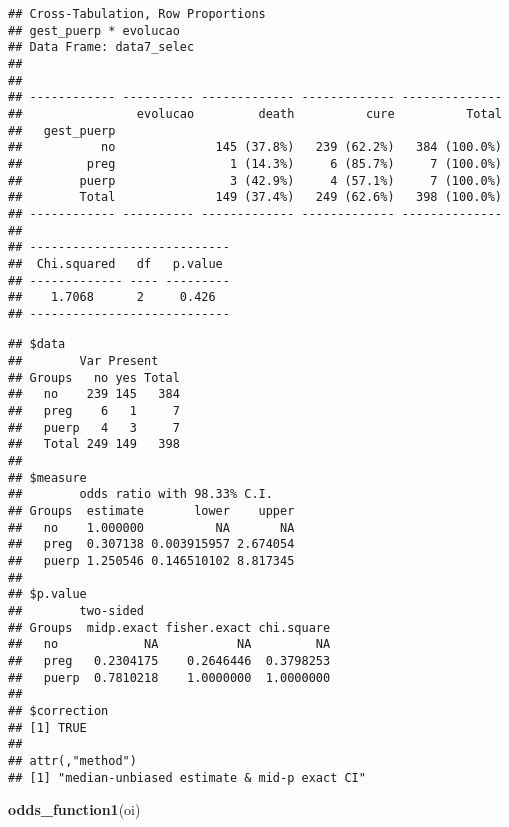 \documentclass[
]{article}
\newenvironment{Shaded}{\begin{snugshade}}{\end{snugshade}}
\newcommand{\KeywordTok}[1]{\textcolor[rgb]{0.13,0.29,0.53}{\textbf{#1}}}
\newcommand{\NormalTok}[1]{#1}
\newcommand{\OperatorTok}[1]{\textcolor[rgb]{0.81,0.36,0.00}{\textbf{#1}}}
\newcommand{\StringTok}[1]{\textcolor[rgb]{0.31,0.60,0.02}{#1}}
\begin{document}
\begin{verbatim}
## Cross-Tabulation, Row Proportions  
## gest_puerp * evolucao  
## Data Frame: data7_selec  
## 
## 
## ------------ ---------- ------------- ------------- --------------
##                evolucao         death          cure          Total
##   gest_puerp                                                      
##           no              145 (37.8%)   239 (62.2%)   384 (100.0%)
##         preg                1 (14.3%)     6 (85.7%)     7 (100.0%)
##        puerp                3 (42.9%)     4 (57.1%)     7 (100.0%)
##        Total              149 (37.4%)   249 (62.6%)   398 (100.0%)
## ------------ ---------- ------------- ------------- --------------
## 
## ----------------------------
##  Chi.squared   df   p.value 
## ------------- ---- ---------
##    1.7068      2     0.426  
## ----------------------------
\end{verbatim}

\begin{Shaded}
\end{Shaded}

\begin{verbatim}
## $data
##        Var Present
## Groups   no yes Total
##   no    239 145   384
##   preg    6   1     7
##   puerp   4   3     7
##   Total 249 149   398
## 
## $measure
##        odds ratio with 98.33% C.I.
## Groups  estimate       lower    upper
##   no    1.000000          NA       NA
##   preg  0.307138 0.003915957 2.674054
##   puerp 1.250546 0.146510102 8.817345
## 
## $p.value
##        two-sided
## Groups  midp.exact fisher.exact chi.square
##   no            NA           NA         NA
##   preg   0.2304175    0.2646446  0.3798253
##   puerp  0.7810218    1.0000000  1.0000000
## 
## $correction
## [1] TRUE
## 
## attr(,"method")
## [1] "median-unbiased estimate & mid-p exact CI"
\end{verbatim}

\begin{Shaded}
\begin{Highlighting}[]
\KeywordTok{odds_function1}\NormalTok{(oi)}
\end{Highlighting}
\end{Shaded}
\end{document}
